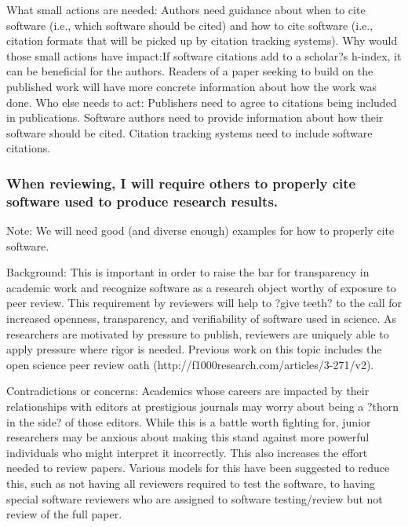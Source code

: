 \documentclass[a4paper,UKenglish]{dagman}
\renewcommand{\paragraph}[1]{\subsubsection*{#1}\xspace}
\begin{document}
What small actions are needed: Authors need guidance about when to cite software (i.e., which software should be cited) and how to cite software (i.e., citation formats that will be picked up by citation tracking systems). 
Why would those small actions have impact:If software citations add to a scholar?s h-index, it can be beneficial for the authors. Readers of a paper seeking to build on the published work will have more concrete information about how the work was done. 
Who else needs to act: Publishers need to agree to citations being included in publications. Software authors need to provide information about how their software should be cited. Citation tracking systems need to include software citations. 


\paragraph{When reviewing, I will require others to properly cite software used to produce research results.}

Note: We will need good (and diverse enough) examples for how to properly cite software.


Background: This is important in order to raise the bar for transparency in academic work and recognize software as a research object worthy of exposure to peer review. This requirement by reviewers will help to ?give teeth? to the call for increased openness, transparency, and verifiability of software used in science. As researchers are motivated by pressure to publish, reviewers are uniquely able to apply pressure where rigor is needed. Previous work on this topic includes the open science peer review oath (http://f1000research.com/articles/3-271/v2). 

Contradictions or concerns: Academics whose careers are impacted by their relationships with editors at prestigious journals may worry about being a ?thorn in the side? of those editors. While this is a battle worth fighting for, junior researchers may be anxious about making this stand against more powerful individuals who might interpret it incorrectly. 
This also increases the effort needed to review papers.  Various models for this have been suggested to reduce this, such as not having all reviewers required to test the software, to having special software reviewers who are assigned to software testing/review but not review of the full paper.
\end{document}
